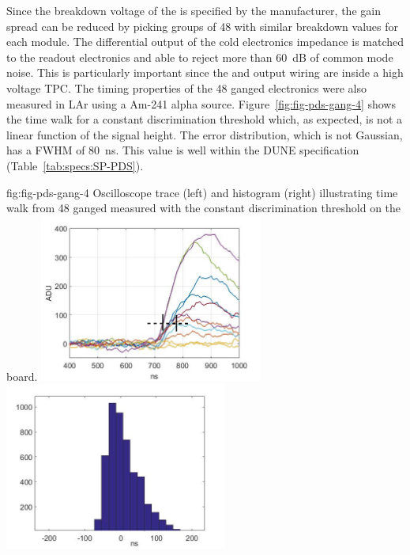 Since the breakdown voltage of the  is specified by the manufacturer, the gain spread can be reduced by picking groups of 48  with similar breakdown values for each module. The differential output of the cold electronics impedance is matched to the readout electronics and able to reject more than \SI{60}{dB} of common mode noise. This is particularly important since the  and output wiring are inside a high voltage TPC. The timing properties of the 48 ganged electronics were also measured 
in LAr using a Am-241 alpha source. 
Figure~\ref{fig:fig-pds-gang-4} shows the time walk for a constant discrimination threshold which, as expected, is not a linear function of the signal height. The error distribution, which is not Gaussian, has a FWHM of \SI{80}{ns}. This value is well within the DUNE specification (Table~\ref{tab:specs:SP-PDS}).

\begin{dunefigure}
 {fig:fig-pds-gang-4}
 {Oscilloscope trace (left) and histogram (right) illustrating time walk from 48 ganged  measured with the constant discrimination threshold on the  board.}
\includegraphics[height=5.5cm]{graphics/pds-gang-time-walk.jpg}
\includegraphics[height=5.5cm]{graphics/pds-gang-time-walk-hist.jpg}
\end{dunefigure}


